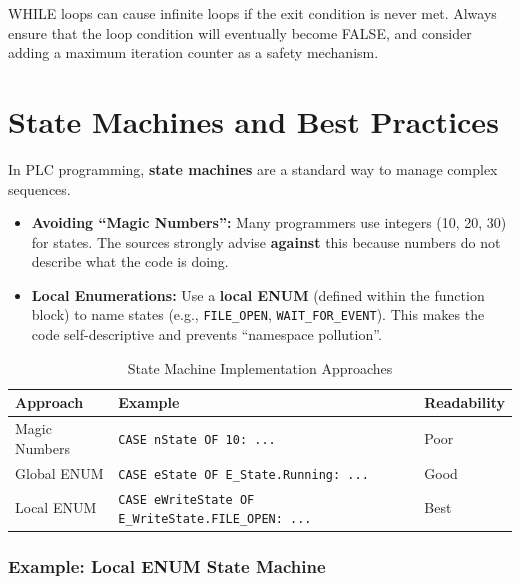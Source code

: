 \documentclass[11pt,a4paper]{article}
\begin{document}
\begin{warningbox}
WHILE loops can cause infinite loops if the exit condition is never met. Always ensure that the loop condition will eventually become FALSE, and consider adding a maximum iteration counter as a safety mechanism.
\end{warningbox}

\section{State Machines and Best Practices}

In PLC programming, \textbf{state machines} are a standard way to manage complex sequences.

\begin{itemize}[leftmargin=*]
    \item \textbf{Avoiding ``Magic Numbers'':} Many programmers use integers (10, 20, 30) for states. The sources strongly advise \textbf{against} this because numbers do not describe what the code is doing.
    
    \item \textbf{Local Enumerations:} Use a \textbf{local ENUM} (defined within the function block) to name states (e.g., \texttt{FILE\_OPEN}, \texttt{WAIT\_FOR\_EVENT}). This makes the code self-descriptive and prevents ``namespace pollution''.
\end{itemize}

\begin{table}[h]
\centering
\begin{tabular}{@{}lll@{}}
\toprule
\textbf{Approach} & \textbf{Example} & \textbf{Readability} \\
\midrule
Magic Numbers & \texttt{CASE nState OF 10: ...} & Poor \\
Global ENUM & \texttt{CASE eState OF E\_State.Running: ...} & Good \\
Local ENUM & \texttt{CASE eWriteState OF E\_WriteState.FILE\_OPEN: ...} & Best \\
\bottomrule
\end{tabular}
\caption{State Machine Implementation Approaches}
\end{table}

\subsubsection*{Example: Local ENUM State Machine}
\end{document}
